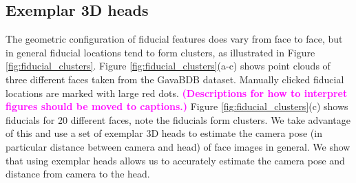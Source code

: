 \documentclass[runningheads]{llncs}
\newcommand {\ericnote} [1] {{\bf \textcolor{magenta}{(#1)}}}
\begin{document}
\subsection{Exemplar 3D heads}
The geometric configuration of fiducial features does vary from face to face, but in general fiducial locations tend to form clusters, as illustrated in Figure \ref{fig:fiducial_clusters}.  
Figure \ref{fig:fiducial_clusters}(a-c) shows point clouds of three different faces taken from the GavaBDB \cite{moreno2004gavabdb} dataset. 
Manually clicked fiducial locations are marked with large red dots.
\ericnote{Descriptions for how to interpret figures should be moved to captions.}
Figure \ref{fig:fiducial_clusters}(c) shows fiducials for 20 different faces, note the fiducials form clusters.  
We take advantage of this and use a set of exemplar 3D heads to estimate the camera pose (in particular distance between camera and head) of face images in general. 
We show that using exemplar heads allows us to accurately estimate the camera pose and distance from camera to the head.
\end{document}
